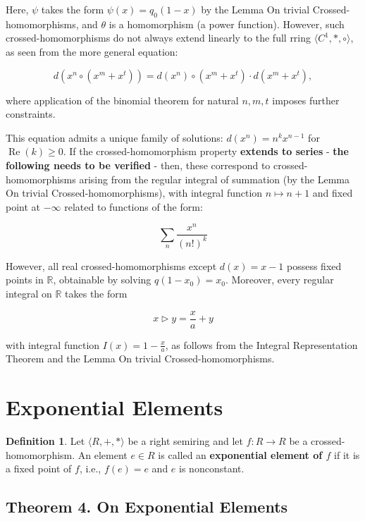 \documentclass[12pt]{article}
\theoremstyle{definition}
\newtheorem{definition}{Definition}[section]
\begin{document}
Here, $\psi$ takes the form $\psi(x) = q_0(1 - x)$ by the Lemma On trivial Crossed-homomorphisms, and $\theta$ is a homomorphism (a power function). However, such crossed-homomorphisms do not always extend linearly to the full rring $\langle C^1, *, \circ \rangle$, as seen from the more general equation:

\[
d(x^n \circ (x^m + x^t)) = d(x^n) \circ (x^m + x^t) \cdot d(x^m + x^t),
\]

where application of the binomial theorem for natural $n, m, t$ imposes further constraints.

\vspace{5pt}
This equation admits a unique family of solutions: $d(x^n) = n^k x^{n-1}$ for $\operatorname{Re}(k) \geq 0$. If the crossed-homomorphism property \textbf{extends to series} - \textbf{the following needs to be verified} - then, these correspond to crossed-homomorphisms arising from the regular integral of summation (by the Lemma On trivial Crossed-homomorphisms), with integral function $n \mapsto n+1$ and fixed point at $-\infty$ related to functions of the form:

\[
\sum_{n} \frac{x^n}{(n!)^k}
\]

However, all real crossed-homomorphisms except $d(x) = x - 1$ possess fixed points in $\mathbb{R}$, obtainable by solving $q(1 - x_0) = x_0$. Moreover, every regular integral on $\mathbb{R}$ takes the form

\[
x \triangleright y = \frac{x}{a} + y
\]

with integral function $I(x) = 1 - \frac{x}{a}$, as follows from the Integral Representation Theorem and the Lemma On trivial Crossed-homomorphisms.

\section{Exponential Elements}


\begin{definition} Let $\langle R, +, * \rangle$ be a right semiring and let $f: R \to R$ be a crossed-homomorphism. An element $e \in R$ is called an \textbf{exponential element of $f$} if it is a fixed point of $f$, i.e., $f(e) = e$ and $e$ is nonconstant.
\end{definition}

\subsection{Theorem 4. On Exponential Elements} 
\end{document}
